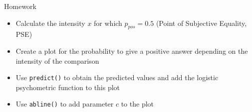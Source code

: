 \documentclass{beamer}
\begin{document}
\begin{frame}[fragile]{}
  \begin{block}{Homework}
    \begin{itemize}
      \item Calculate the intensity $x$ for which $p_{pos} = 0.5$ (Point of
        Subjective Equality, PSE)
      \item Create a plot for the probability to give a positive answer
        depending on the intensity of the comparison
      \item Use \texttt{predict()} to obtain the predicted values and add
        the logistic psychometric function to this plot
      \item Use \texttt{abline()} to add parameter $c$ to the plot
    \end{itemize}
  \end{block}
\end{frame}

% 
% 
\end{document}
